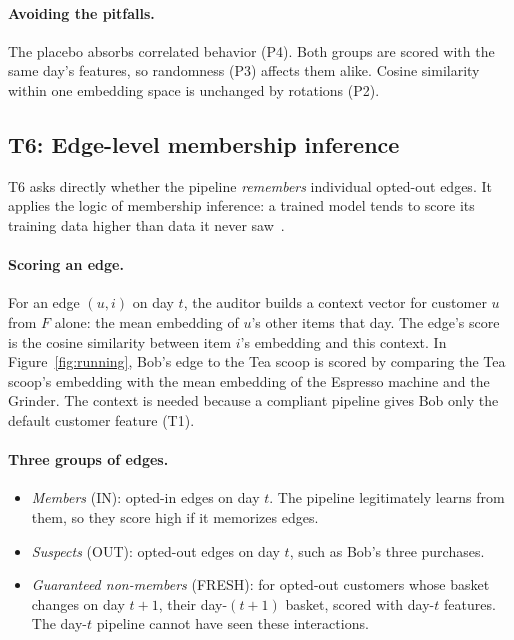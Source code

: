\documentclass[10pt,twocolumn,letterpaper]{article}
\theoremstyle{definition}
\begin{document}
\paragraph{Avoiding the pitfalls.}
The placebo absorbs correlated behavior (P4). Both groups are scored with
the same day's features, so randomness (P3) affects them alike. Cosine
similarity within one embedding space is unchanged by rotations (P2).

\subsection{T6: Edge-level membership inference}
T6 asks directly whether the pipeline \emph{remembers} individual opted-out edges.
It applies the logic of membership inference: a trained model tends to score
its training data higher than data it never
saw~\citep{shokri2017membership,carlini2022first}.

\paragraph{Scoring an edge.}
For an edge $(u,i)$ on day $t$, the auditor builds a context vector for customer
$u$ from $F$ alone: the mean embedding of $u$'s other items that day. The edge's
score is the cosine similarity between item $i$'s embedding and this context.
In Figure~\ref{fig:running}, Bob's edge to the Tea scoop is scored by
comparing the Tea scoop's embedding with the mean embedding of the Espresso
machine and the Grinder. The context is needed because a compliant pipeline
gives Bob only the default customer feature (T1).

\paragraph{Three groups of edges.}
\begin{itemize}
  \item \emph{Members} (IN): opted-in edges on day $t$. The pipeline legitimately
        learns from them, so they score high if it memorizes edges.
  \item \emph{Suspects} (OUT): opted-out edges on day $t$, such as Bob's three
        purchases.
  \item \emph{Guaranteed non-members} (FRESH): for opted-out customers whose
        basket changes on day $t{+}1$, their day-$(t{+}1)$ basket, scored with
        day-$t$ features. The day-$t$ pipeline cannot have seen these
        interactions.
\end{itemize}
\end{document}
